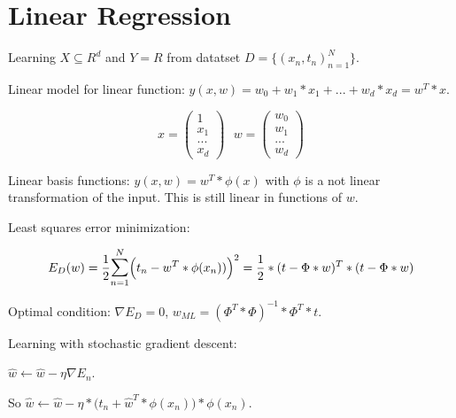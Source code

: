 \section{Linear Regression}

Learning $X \subseteq R^d$ and $Y = R$ from datatset $D = \{(x_n, t_n)^N_{n=1}\}$.

Linear model for linear function: $y(x, w) = w_0 + w_1*x_1 + ... + w_d*x_d = w^T*x$.

\[
x = \begin{pmatrix} 1 \\ x_1 \\ ... \\ x_d \end{pmatrix} \text{ } w = \begin{pmatrix} w_0 \\ w_1 \\ ... \\ w_d \end{pmatrix}
\]

Linear basis functions: $y(x, w) = w^T*\phi(x)$ with $\phi$ is a not linear transformation of the input. This is still linear in functions of $w$.

Least squares error minimization:

\[
E_D(w) = \frac{1}{2}\mathlarger{\sum}_{n=1}^N \Big(t_n - w^T*\phi(x_n))\Big)^2 = \frac{1}{2}*(t - \Phi*w)^T*(t - \Phi*w)
\]

Optimal condition: $\nabla E_D = 0$, $w_{ML} = (\Phi^T*\Phi)^{-1}*\Phi^T*t$.

Learning with stochastic gradient descent:

$\hat{w} \leftarrow \hat{w} - \eta\nabla E_n$.

So $\hat{w} \leftarrow \hat{w} - \eta*\Big(t_n + \hat{w}^T*\phi(x_n)\Big)*\phi(x_n)$.
